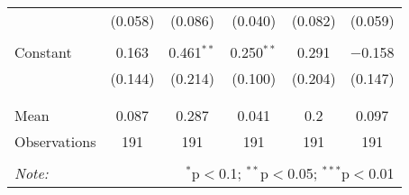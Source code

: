 \begin{tabular}{@{\extracolsep{5pt}}lccccc}
  & (0.058) & (0.086) & (0.040) & (0.082) & (0.059) \\ 
  & & & & & \\ 
 Constant & 0.163 & 0.461$^{**}$ & 0.250$^{**}$ & 0.291 & $-$0.158 \\ 
  & (0.144) & (0.214) & (0.100) & (0.204) & (0.147) \\ 
  & & & & & \\ 
\hline \\[-1.8ex] 
Mean & 0.087 & 0.287 & 0.041 & 0.2 & 0.097 \\ 
Observations & 191 & 191 & 191 & 191 & 191 \\ 
\hline 
\hline \\[-1.8ex] 
\textit{Note:}  & \multicolumn{5}{r}{$^{*}$p$<$0.1; $^{**}$p$<$0.05; $^{***}$p$<$0.01} \\ 
\end{tabular} 
